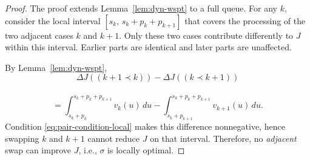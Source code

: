 \documentclass[letterpaper]{article}
\newtheorem{remark}{Remark}
\newif\ifconf
\begin{document}
\else
  \begin{proof}
The proof extends Lemma~\ref{lem:dyn-wspt} to a full queue.
For any $k$, consider the local interval
$[s_k,\,s_k+p_{k}+p_{{k+1}}]$ that covers the processing of the two
adjacent cases $k$ and ${k+1}$.
Only these two cases contribute differently to $J$ within this interval. Earlier parts are identical and later parts are unaffected.

By Lemma~\ref{lem:dyn-wspt},
\[
\Delta J(({k+1}\prec k))-\Delta J((k\prec {k+1}))
\]
\\
\[
=\int_{s_k+p_{k}}^{s_k+p_{k}+p_{{k+1}}}\! v_{k}(u)\,du
-\int_{s_k+p_{{k+1}}}^{s_k+p_{k}+p_{{k+1}}}\! v_{{k+1}}(u)\,du.
\]
Condition \eqref{eq:pair-condition-local} makes this difference nonnegative,
hence swapping $k$ and ${k+1}$ cannot reduce $J$ on that interval.
Therefore, no \emph{adjacent} swap can improve $J$, i.e., $\sigma$ is locally optimal.
\end{proof}
\fi







\end{document}
